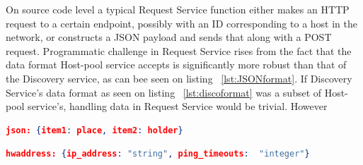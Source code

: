 On source code level a typical Request Service function either makes an HTTP request to a certain endpoint, possibly with an ID corresponding to a host in the network, or constructs a JSON payload and sends that along with a POST request. Programmatic challenge in Request Service rises from the fact that the data format Host-pool service accepts is significantly more robust than that of the Discovery service, as can bee seen on listing ~\ref{lst:JSONformat}. If Discovery Service's data format as seen on listing ~\ref{lst:discoformat} was a subset of Host-pool service's, handling data in Request Service would be trivial. However

\begin{lstlisting}[language=json,firstnumber=1, caption={JSON schema accepted by the Host-pool Service for a single host}, captionpos=b, label=lst:JSONformat]
json: {item1: place, item2: holder}
\end{lstlisting}

\begin{lstlisting}[language=json,firstnumber=1, caption={Discovery Service data format for a single host}, captionpos=b, label=lst:discoformat]
hwaddress: {ip_address: "string", ping_timeouts:  "integer"}
\end{lstlisting}